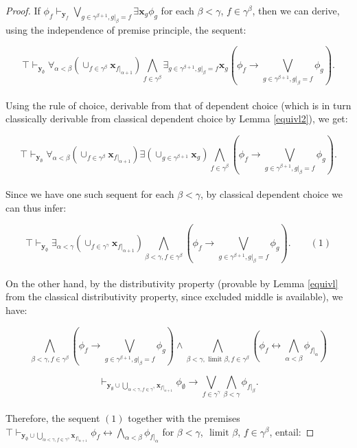 \documentclass[a4paper,11pt]{article}
\theoremstyle{plain}
\theoremstyle{plain}
\theoremstyle{remark}
\begin{document}
\begin{proof}
If $\phi_{f} \vdash_{\mathbf{y}_{f}} \bigvee_{g \in \gamma^{\beta+1}, g|_{\beta}=f} \exists \mathbf{x}_{g} \phi_{g}$ for each $\beta<\gamma$, $f \in \gamma^{\beta}$, then we can derive, using the independence of premise principle, the sequent:

$$\top \vdash_{\mathbf{y}_{\emptyset}} \forall_{\alpha < \beta}(\cup_{f \in \gamma^{\beta}}\mathbf{x}_{f|_{\alpha+1}}) \bigwedge_{f \in \gamma^{\beta}} \exists_{g \in \gamma^{\beta+1}, g|_{\beta}=f} \mathbf{x}_{g} \left(\phi_f \to \bigvee_{g \in \gamma^{\beta+1}, g|_{\beta}=f} \phi_{g}\right).$$
\\
Using the rule of choice, derivable from that of dependent choice (which is in turn classically derivable from classical dependent choice by Lemma \ref{equivl2}), we get:

$$\top \vdash_{\mathbf{y}_{\emptyset}} \forall_{\alpha < \beta}(\cup_{f \in \gamma^{\beta}}\mathbf{x}_{f|_{\alpha+1}}) \exists (\cup_{g \in \gamma^{\beta+1}}\mathbf{x}_{g}) \bigwedge_{f \in \gamma^{\beta}} \left(\phi_f \to \bigvee_{g \in \gamma^{\beta+1}, g|_{\beta}=f} \phi_{g}\right).$$
\\
Since we have one such sequent for each $\beta<\gamma$, by classical dependent choice we can thus infer:

$$\top \vdash_{\mathbf{y}_{\emptyset}} \exists_{\alpha < \gamma} (\cup_{f \in \gamma^{\gamma}}\mathbf{x}_{f|_{\alpha+1}}) \bigwedge_{\beta<\gamma, f \in \gamma^{\beta}} \left(\phi_f \to \bigvee_{g \in \gamma^{\beta+1}, g|_{\beta}=f} \phi_{g}\right). \qquad (1)$$
\\
On the other hand, by the distributivity property (provable by Lemma \ref{equivl} from the classical distributivity property, since excluded middle is available), we have:

$$\bigwedge_{\beta<\gamma, f \in \gamma^{\beta}} \left(\phi_f \to \bigvee_{g \in \gamma^{\beta+1}, g|_{\beta}=f} \phi_{g}\right) \wedge \bigwedge_{\beta < \gamma, \text{ limit }\beta, f \in \gamma^{\beta}} \left(\phi_{f} \leftrightarrow \bigwedge_{\alpha<\beta}\phi_{f|_{\alpha}}\right)$$

$$\vdash_{\mathbf{y}_{\emptyset} \cup \bigcup_{\alpha < \gamma, f \in \gamma^{\gamma}} \mathbf{x}_{f|_{\alpha +1}}} \phi_{\emptyset} \to \bigvee_{f \in \gamma^{\gamma}} \bigwedge_{\beta<\gamma}\phi_{f|_\beta}.$$
\\
Therefore, the sequent $(1)$ together with the premises $\top \vdash_{\mathbf{y}_{\emptyset} \cup \bigcup_{\alpha < \gamma, f \in \gamma^{\gamma}} \mathbf{x}_{f|_{\alpha +1}}} \phi_{f} \leftrightarrow \bigwedge_{\alpha<\beta}\phi_{f|_{\alpha}}$ for $\beta < \gamma$, $\text{ limit }\beta$, $f \in \gamma^{\beta}$, entail:


\end{proof}
\end{document}
